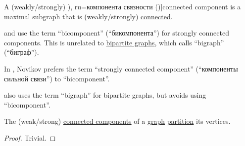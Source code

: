 \begin{definition}\label{def:graph_connected_component}
  A (weakly/strongly) \term[bg=компонента (\cite[15]{Мирчев2001Графи}), ru=компонента связности (\cite[286]{БелоусовТкачёв2004ДискретнаяМатематика})]{connected component} is a maximal subgraph that is (weakly/strongly) \hyperref[def:graph_connectedness]{connected}.
\end{definition}
\begin{comments}
  \item \Textcite[425]{БелоусовТкачёв2004ДискретнаяМатематика} and \textcite[425]{Зыков2004ТеорияГрафов} use the term \enquote{bicomponent} (\enquote{бикомпонента}) for strongly connected components. This is unrelated to \hyperref[def:multipartite_graph]{bipartite graphs}, which \textcite[\S 7.3.3]{Новиков2013ДискретнаяМатематика} calls \enquote{bigraph} (\enquote{биграф}).

  In \cite[\S 8.5.2]{Новиков2013ДискретнаяМатематика}, Novikov prefers the term \enquote{strongly connected component} (\enquote{компоненты сильной связи}) to \enquote{bicomponent}.

  \textcite[27]{Harary1969GraphTheory} also uses the term \enquote{bigraph} for bipartite graphs, but avoids using \enquote{bicomponent}.
\end{comments}

\begin{proposition}\label{thm:connected_components_partition_graph}
  The (weak/strong) \hyperref[def:graph_connected_component]{connected components} of a \hyperref[rem:graph_of_unspecified_type]{graph} \hyperref[def:set_partition]{partition} its vertices.
\end{proposition}
\begin{proof}
  Trivial.
\end{proof}

